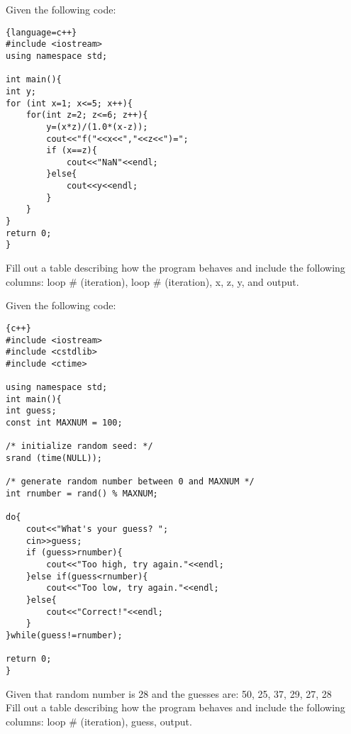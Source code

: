 \documentclass[addpoints,12pt]{exam}
\begin{document}

\begin{center}
\end{center}
\vspace{0.1in}
\begin{center}
\gradetable[h][questions]
\end{center}

\begin{questions}
\question [5]
Given the following code:
\begin{lstlisting}{language=c++}
#include <iostream>
using namespace std;

int main(){
int y;
for (int x=1; x<=5; x++){
    for(int z=2; z<=6; z++){
        y=(x*z)/(1.0*(x-z));
        cout<<"f("<<x<<","<<z<<")=";
        if (x==z){
            cout<<"NaN"<<endl;
        }else{
            cout<<y<<endl;
        }
    }
}
return 0;
}
\end{lstlisting}
Fill out a table describing how the program behaves and include the following columns:  loop \# (iteration), loop \# (iteration), x, z, y, and output.

\break
\question [5]
Given the following code:
\begin{lstlisting}{c++}
#include <iostream>
#include <cstdlib>
#include <ctime>

using namespace std;
int main(){
int guess;
const int MAXNUM = 100;

/* initialize random seed: */
srand (time(NULL));

/* generate random number between 0 and MAXNUM */
int rnumber = rand() % MAXNUM;

do{
    cout<<"What's your guess? ";
    cin>>guess;
    if (guess>rnumber){
        cout<<"Too high, try again."<<endl;
    }else if(guess<rnumber){
        cout<<"Too low, try again."<<endl;
    }else{
        cout<<"Correct!"<<endl;
    }
}while(guess!=rnumber);

return 0;
}
\end{lstlisting}
Given that  random number is 28 and the guesses are: 50, 25, 37, 29, 27, 28\\
Fill out a table describing how the program behaves and include the following columns: loop \# (iteration), guess, output.

\end{questions}
\end{document}

